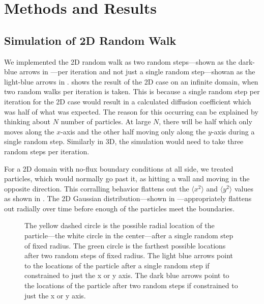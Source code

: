 \chapter{Methods and Results}

\section{Simulation of 2D Random Walk}

We implemented the 2D random walk as two random steps---shown as the dark-blue arrows in ---per iteration and not just a single random step---showan as the light-blue arrows in .  shows the result of the 2D case on an infinite domain, when two random walks per iteration is taken. This is because a single random step per iteration for the 2D case would result in a calculated diffusion coefficient which was half of what was expected. The reason for this occurring can be explained by thinking about $N$ number of particles. At large $N$, there will be half which only moves along the $x$-axis and the other half moving only along the $y$-axis during a single random step. Similarly in 3D, the simulation would need to take three random steps per iteration. 

For a 2D domain with no-flux boundary conditions at all side, we treated particles, which would normally go past it, as hitting a wall and moving in the opposite direction. This corralling behavior flattens out the $\langle x^2\rangle$ and $\langle y^2\rangle$ values as shown in . The 2D Gaussian distribution---shown in ---appropriately flattens out radially over time before enough of the particles meet the boundaries.

\begin{figure}[h]
    \centering
    
    \caption{The yellow dashed circle is the possible radial location of the particle---the white circle in the center---after a single random step of fixed radius. The green circle is the farthest possible locations after two random steps of fixed radius. The light blue arrows point to the locations of the particle after a single random step if constrained to just the x or y axis. The dark blue arrows point to the locations of the particle after two random steps if constrained to just the x or y axis.
    }
    \label{fig:one-vs-two_per-timestep}
\end{figure}

